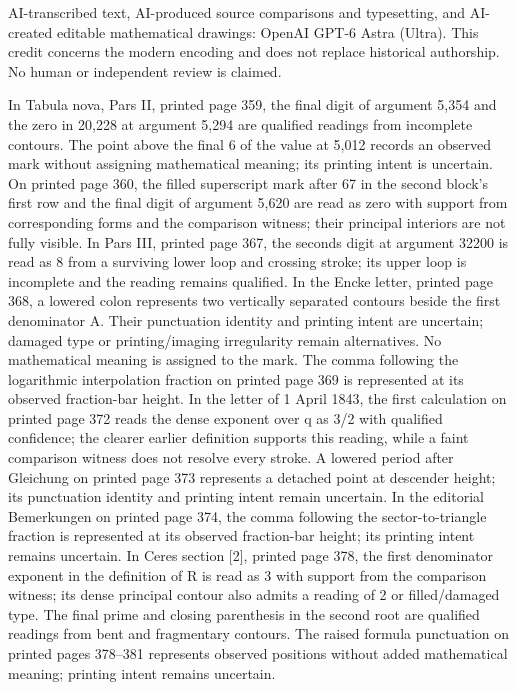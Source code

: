 AI-transcribed text, AI-produced source comparisons and typesetting, and AI-created editable mathematical drawings: OpenAI GPT-6 Astra (Ultra). This credit concerns the modern encoding and does not replace historical authorship. No human or independent review is claimed.

In Tabula nova, Pars II, printed page 359, the final digit of argument 5,354 and the zero in 20,228 at argument 5,294 are qualified readings from incomplete contours. The point above the final 6 of the value at 5,012 records an observed mark without assigning mathematical meaning; its printing intent is uncertain. On printed page 360, the filled superscript mark after 67 in the second block’s first row and the final digit of argument 5,620 are read as zero with support from corresponding forms and the comparison witness; their principal interiors are not fully visible. In Pars III, printed page 367, the seconds digit at argument 32200 is read as 8 from a surviving lower loop and crossing stroke; its upper loop is incomplete and the reading remains qualified. In the Encke letter, printed page 368, a lowered colon represents two vertically separated contours beside the first denominator A. Their punctuation identity and printing intent are uncertain; damaged type or printing/imaging irregularity remain alternatives. No mathematical meaning is assigned to the mark. The comma following the logarithmic interpolation fraction on printed page 369 is represented at its observed fraction-bar height. In the letter of 1 April 1843, the first calculation on printed page 372 reads the dense exponent over q as 3/2 with qualified confidence; the clearer earlier definition supports this reading, while a faint comparison witness does not resolve every stroke. A lowered period after Gleichung on printed page 373 represents a detached point at descender height; its punctuation identity and printing intent remain uncertain. In the editorial Bemerkungen on printed page 374, the comma following the sector-to-triangle fraction is represented at its observed fraction-bar height; its printing intent remains uncertain.
 In Ceres section [2], printed page 378, the first denominator exponent in the definition of R is read as 3 with support from the comparison witness; its dense principal contour also admits a reading of 2 or filled/damaged type. The final prime and closing parenthesis in the second root are qualified readings from bent and fragmentary contours. The raised formula punctuation on printed pages 378–381 represents observed positions without added mathematical meaning; printing intent remains uncertain.
